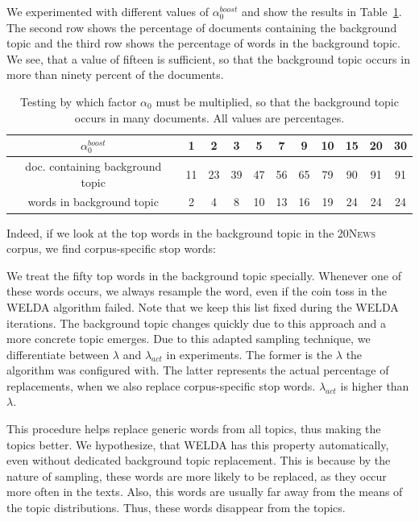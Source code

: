 \documentclass[
        a4paper,
        titlepage,
        twoside,
        parskip,
        numbers=noenddot
        ]{scrbook}
\newcommand{\ra}[1]{\renewcommand{\arraystretch}{#1}}
\theoremstyle{break}
\begin{document}
We experimented with different values of $\alpha_0^{boost}$ and show the results in Table~\ref{table:alpha0_boost}.
The second row shows the percentage of documents containing the background topic and the third row shows the percentage of words in the background topic.
We see, that a value of fifteen is sufficient, so that the background topic occurs in more than ninety percent of the documents.
\begin{table}[]
  \ra{1.2}
  \centering
  \caption{Testing by which factor $\alpha_0$ must be multiplied, so that the background topic occurs in many documents.
  All values are percentages.}
  \label{table:alpha0_boost}
  \begin{tabular}{ccccccccccc}
    \toprule
    $\alpha_0^{boost}$                & 1     & 2     & 3     & 5     & 7     & 9     & 10    & 15    & 20    & 30    \\
    \midrule
  doc. containing background topic  & 11  & 23  & 39  & 47  & 56  & 65  & 79  & 90  & 91  & 91  \\
  words in background topic & 2   & 4   & 8   & 10  & 13  & 16  & 19  & 24  & 24  & 24 \\
    \bottomrule
  \end{tabular}
\end{table}
Indeed, if we look at the top words in the background topic in the \textsc{20News} corpus, we find corpus-specific stop words: \\
\noindent{}

We treat the fifty top words in the background topic specially.
Whenever one of these words occurs, we always resample the word, even if the coin toss in the WELDA algorithm failed.
Note that we keep this list fixed during the WELDA iterations.
The background topic changes quickly due to this approach and a more concrete topic emerges.
Due to this adapted sampling technique, we differentiate between $\lambda$ and $\lambda_{act}$ in experiments.
The former is the $\lambda$ the algorithm was configured with.
The latter represents the actual percentage of replacements, when we also replace corpus-specific stop words.
$\lambda_{act}$ is higher than $\lambda$.

This procedure helps replace generic words from all topics, thus making the topics better.
We hypothesize, that WELDA has this property automatically, even without dedicated background topic replacement.
This is because by the nature of sampling, these words are more likely to be replaced, as they occur more often in the texts.
Also, this words are usually far away from the means of the topic distributions.
Thus, these words disappear from the topics.
\end{document}
